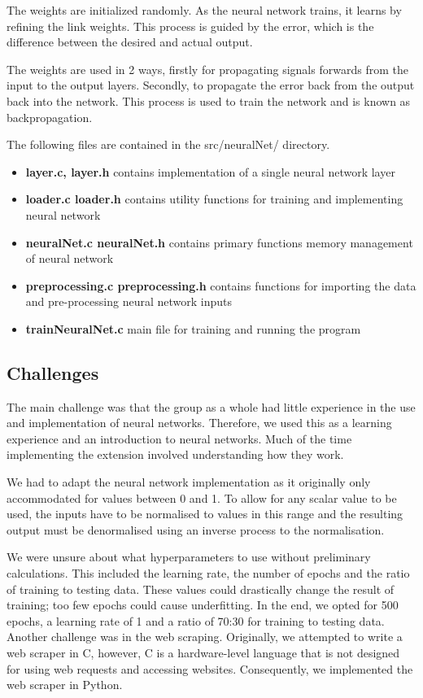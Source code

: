 \documentclass[11pt]{article}
\begin{document}
The weights are initialized randomly. As the neural network trains, it learns by refining the link weights. This process is guided by the error, which is the difference between the desired and actual output. 

The weights are used in 2 ways, firstly for propagating signals forwards from the input to the output layers. Secondly, to propagate the error back from the output back into the network. This process is used to train the network and is known as backpropagation. 

The following files are contained in the src/neuralNet/ directory.

\begin{itemize}
    \item \textbf{layer.c, layer.h} contains implementation of a single neural network layer 
    \item \textbf{loader.c loader.h} contains utility functions for training and implementing neural network
    \item \textbf{neuralNet.c neuralNet.h} contains primary functions memory management of neural network
    \item \textbf{preprocessing.c preprocessing.h} contains functions for importing the data and pre-processing neural network inputs
    \item \textbf{trainNeuralNet.c} main file for training and running the program
\end{itemize}

\subsection{Challenges}
The main challenge was that the group as a whole had little experience in the use and implementation of neural networks. 
Therefore, we used this as a learning experience and an introduction to neural networks. 
Much of the time implementing the extension involved understanding how they work.

We had to adapt the neural network implementation as it originally only accommodated for values between 0 and 1.
To allow for any scalar value to be used, the inputs have to be normalised to values in this range
and the resulting output must be denormalised using an inverse process to the normalisation.

We were unsure about what hyperparameters to use without preliminary calculations. This included the learning rate, the number of epochs and the ratio of training to testing data. These values could drastically change the result of training; too few epochs could cause underfitting. 
In the end, we opted for 500 epochs, a learning rate of 1 and a ratio of 70:30 for training to testing data.
Another challenge was in the web scraping. Originally, we attempted to write a web scraper in C, however, C is a hardware-level language that is not designed for using web requests and accessing websites. Consequently, we implemented the web scraper in Python.
\end{document}
